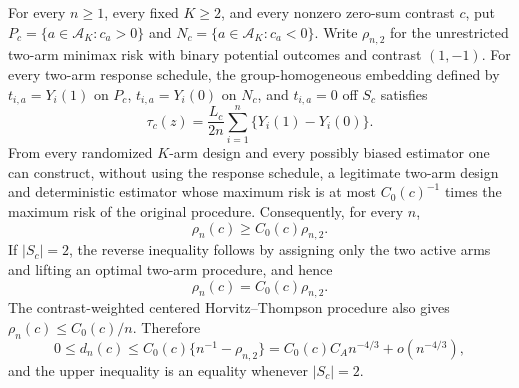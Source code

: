 For every \(n\geq1\), every fixed \(K\geq2\), and every nonzero zero-sum contrast \(c\), put \(P_c=\{a\in\mathcal A_K:c_a>0\}\) and \(N_c=\{a\in\mathcal A_K:c_a<0\}\).  Write \(\rho_{n,2}\) for the unrestricted two-arm minimax risk with binary potential outcomes and contrast \((1,-1)\).  For every two-arm response schedule, the group-homogeneous embedding defined by \(t_{i,a}=Y_i(1)\) on \(P_c\), \(t_{i,a}=Y_i(0)\) on \(N_c\), and \(t_{i,a}=0\) off \(S_c\) satisfies
\[
 \tau_c(z)=\frac{L_c}{2n}\sum_{i=1}^n\{Y_i(1)-Y_i(0)\}.
\]
From every randomized \(K\)-arm design and every possibly biased estimator one can construct, without using the response schedule, a legitimate two-arm design and deterministic estimator whose maximum risk is at most \(C_0(c)^{-1}\) times the maximum risk of the original procedure.  Consequently, for every \(n\),
\[
 \rho_n(c)\geq C_0(c)\rho_{n,2}.
\]
If \(|S_c|=2\), the reverse inequality follows by assigning only the two active arms and lifting an optimal two-arm procedure, and hence
\[
 \rho_n(c)=C_0(c)\rho_{n,2}.
\]
The contrast-weighted centered Horvitz--Thompson procedure also gives \(\rho_n(c)\leq C_0(c)/n\).  Therefore
\[
 0\leq d_n(c)\leq C_0(c)\{n^{-1}-\rho_{n,2}\}
 =C_0(c)C_A n^{-4/3}+o(n^{-4/3}),
\]
and the upper inequality is an equality whenever \(|S_c|=2\).